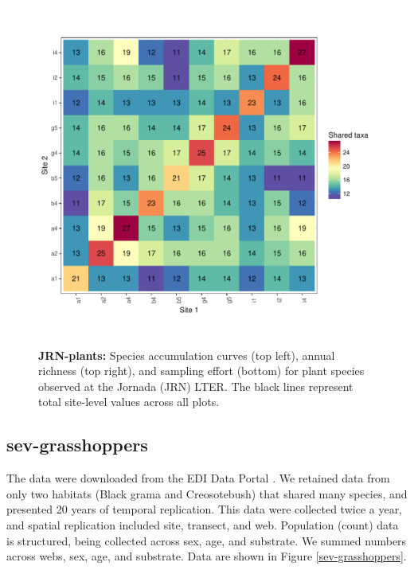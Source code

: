 \documentclass[11pt, oneside]{article}
\begin{document}
\begin{figure}[h!]
\includegraphics[scale = 0.4]{jrn-plants-compagnoni_spp_shared.pdf}
\caption{{\bf JRN-plants:} Species accumulation curves (top left),  annual richness (top right), and sampling effort (bottom)  for plant species observed at the Jornada (JRN) LTER. The black lines represent total site-level values across all plots.}
\label{jrn-plants}
\end{figure}


\subsection {sev-grasshoppers}
The data were downloaded from the EDI Data Portal \citep{sev-grasshopper}.
We retained data from only two habitats (Black grama and Creosotebush) that shared many species, and presented 20 years of temporal replication. This data were collected twice a year, and spatial replication included site, transect, and web. 
Population (count) data is structured, being collected across sex, age, and substrate. 
We summed numbers across webs, sex, age, and substrate.
Data are shown in Figure \ref{sev-grasshoppers}.
  
\end{document}
